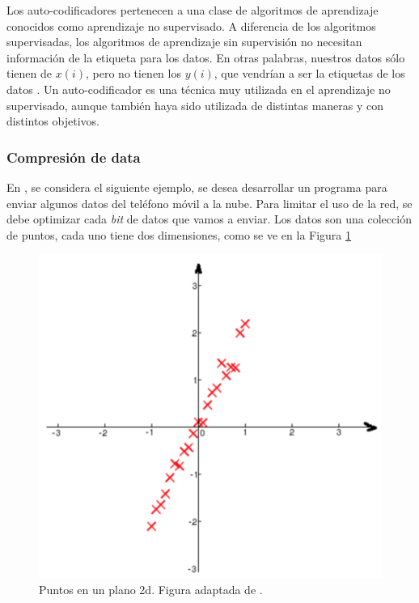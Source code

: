     Los auto-codificadores pertenecen a una clase de algoritmos de aprendizaje conocidos como aprendizaje no supervisado. A diferencia de los algoritmos supervisadas, los algoritmos de aprendizaje sin supervisión no necesitan información de la etiqueta para los datos. En otras palabras, nuestros datos sólo tienen de $x(i)$, pero no tienen los $y(i)$, que vendrían a ser la etiquetas de los datos \cite{Le15atutorial, website:UFLDL}. Un auto-codificador es una técnica muy utilizada en el aprendizaje no supervisado, aunque también haya sido utilizada de distintas maneras y con distintos objetivos.

    \subsubsection{Compresión de data}

    En \cite{Le15atutorial}, se considera el siguiente ejemplo, se desea desarrollar un programa para enviar algunos datos del teléfono móvil a la nube. Para limitar el uso de la red, se debe optimizar cada \textit{bit} de datos que vamos a enviar. Los datos son una colección de puntos, cada uno tiene dos dimensiones, como se ve en la Figura \ref{fig:aenco1}
    \begin{figure}[htp]
        \centering
        \includegraphics[scale=0.37]{chapter3/aenco1.png}
        \caption{Puntos en un plano 2d. Figura adaptada de \cite{Le15atutorial}.}
        \label{fig:aenco1}
     \end{figure}

